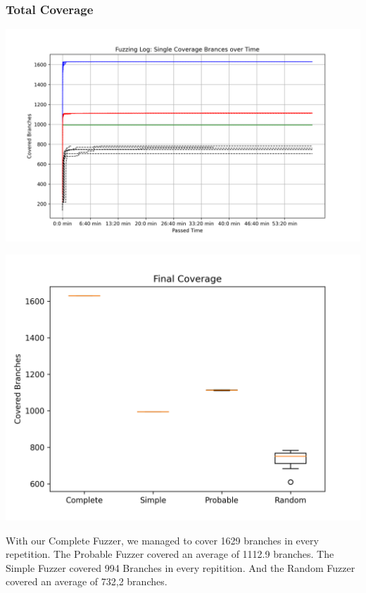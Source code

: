 \documentclass[runningheads]{llncs}
\begin{document}
\subsubsection{Total Coverage}
\begin{center}
\includegraphics[width=\textwidth]{img/complete_coverage}
\label{fig1}
\end{center}
\begin{center}
\includegraphics[width=\textwidth]{img/boxplot_coverage}
\label{fig2}
\end{center}

With our Complete Fuzzer, we managed to cover 1629 branches in every repetition. The Probable Fuzzer covered an average of 1112.9 branches. The Simple Fuzzer covered 994 Branches in every repitition. And the Random Fuzzer covered an average of 732,2 branches.
\end{document}

